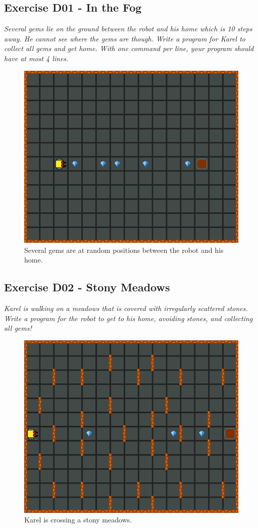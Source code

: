 \documentclass[article,A4,12pt]{llncs}
\begin{document}
{{{{\begin{enumerate}
\end{enumerate}

\subsection{Exercise D01 - In the Fog}

{\em Several gems lie on the ground between the robot and his home which is 10 steps away. 
He cannot see where the gems are though. 
Write a program for Karel to collect all gems and get home. With one command per 
line, your program should have at most 4 lines.}


\begin{figure}[!ht]
\begin{center}
\includegraphics[height=0.4\textwidth]{img/d01.png}
\end{center}
\vspace{-4mm}
\caption{Several gems are at random positions between the robot and his home.}
\label{fig:d01}
\vspace{-4mm}
\end{figure}
\noindent

\subsection{Exercise D02 - Stony Meadows}

{\em Karel is walking on a meadows that is covered with irregularly 
scattered stones. Write a program for the robot to get to his home, 
avoiding stones, and collecting all gems!  }


\begin{figure}[!ht]
\begin{center}
\includegraphics[height=0.4\textwidth]{img/d02.png}
\end{center}
\vspace{-4mm}
\caption{Karel is crossing a stony meadows.}
\label{fig:d02}
\vspace{-10mm}
\end{figure}
\noindent

}}}}
\end{document}
